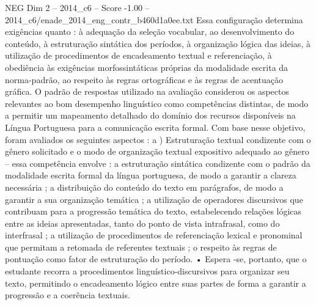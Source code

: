 \begin{textsample}{NEG Dim 2 – 2014\_c6 – Score -1.00 – 2014\_c6/enade\_2014\_eng\_contr\_b460d1a0ee.txt}
Essa configuração determina exigências quanto : à adequação da seleção vocabular, ao desenvolvimento do conteúdo, à estruturação sintática dos períodos, à organização lógica das ideias, à utilização de procedimentos de encadeamento textual e referenciação, à obediência às exigências morfossintáticas próprias da modalidade escrita da norma-padrão, ao respeito às regras ortográficas e às regras de acentuação gráfica.
O padrão de respostas utilizado na avaliação considerou os aspectos relevantes ao bom desempenho linguístico como competências distintas, de modo a permitir um mapeamento detalhado do domínio dos recursos disponíveis na Língua Portuguesa para a comunicação escrita formal.
Com base nesse objetivo, foram avaliados os seguintes aspectos : a ) Estruturação textual condizente com o gênero solicitado e o modo de organização textual expositivo adequado ao gênero – essa competência envolve : a estruturação sintática condizente com o padrão da modalidade escrita formal da língua portuguesa, de modo a garantir a clareza necessária ; a distribuição do conteúdo do texto em parágrafos, de modo a garantir a sua organização temática ; a utilização de operadores discursivos que contribuam para a progressão temática do texto, estabelecendo relações lógicas entre as ideias apresentadas, tanto do ponto de vista intrafrasal, como do interfrasal ; a utilização de procedimentos de referenciação lexical e pronominal que permitam a retomada de referentes textuais ; o respeito às regras de pontuação como fator de estruturação do período. • Espera -se, portanto, que o estudante recorra a procedimentos linguístico-discursivos para organizar seu texto, permitindo o encadeamento lógico entre suas partes de forma a garantir a progressão e a coerência textuais.

\end{textsample}

